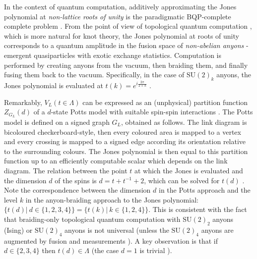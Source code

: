 In the context of quantum computation,
additively approximating the Jones polynomial at \emph{non-lattice roots of unity} is the paradigmatic BQP-complete complete problem \cite{Aharonov_2008,kuperberg2014hard}.
From the point of view
of topological quantum computation \cite{pachos_2012}, which is more natural for knot theory, 
the Jones polynomial at roots of unity corresponds to a quantum amplitude in the fusion space of \emph{non-abelian anyons} - emergent quasiparticles with exotic exchange statistics.
Computation is performed by creating anyons from the vacuum, then braiding them, and finally fusing them back to the vacuum.
Specifically, in the case of $\text{SU}(2)_k$ anyons, the Jones polynomial is evaluated at $t(k) = e^{i\frac{2\pi}{2+k}}$ \cite{Rowell_2018}.



Remarkably, $V_L(t\in\Lambda)$ can be expressed as an (unphysical) partition function $Z_{G_L}(d)$ of a $d$-state Potts model with suitable spin-spin interactions \cite{RevModPhys.64.1099}.
The Potts model is defined on a signed graph $G_L$, obtained as follows.
The link diagram is bicoloured checkerboard-style,
then every coloured area is mapped to a vertex and every crossing is mapped to a signed edge according
its orientation relative to the surrounding colours.
The Jones polynomial is then equal to this partition function up to an efficiently computable scalar which depends on the link diagram.  
The relation between the point $t$ at which the Jones is evaluated and the dimension $d$ of the spins is $d = t + t^{-1} +2$,
which can be solved for $t(d)$ \cite{PhysRevE.100.033303}.
Note the correspondence between the dimension $d$ in the Potts approach and the level $k$ in the anyon-braiding approach to the Jones polynomial: $\{t(d) | ~ d \in\{1,2,3,4\} \} = \{ t(k) | ~ k\in\{1,2,4\} \}$.
This is consistent with the fact that braiding-only topological quantum computation with $\text{SU}(2)_2$ anyons (Ising) or $\text{SU}(2)_4$ anyons is not universal (unless the $\text{SU}(2)_4$ anyons are augmented by fusion and measurements \cite{Levaillant_2015}).
A key observation is that if $d\in\{2,3,4\}$ then $t(d)\in\Lambda$ (the case $d=1$ is trivial \cite{jaeger_vertigan_welsh_1990}).

